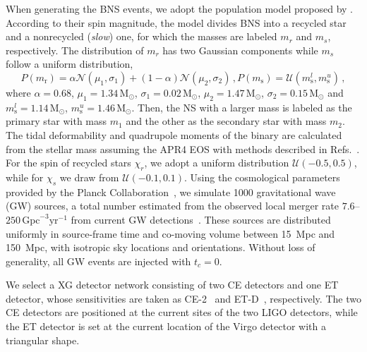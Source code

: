 \documentclass[a4paper,11pt]{article}
\begin{document}
When generating the BNS events, we adopt the population model proposed by \citet{Farrow:2019xnc}. 
According to their spin magnitude, the model divides BNS into a recycled star and a nonrecycled 
(\emph{slow}) one, for which the masses are labeled $m_r$ and $m_s$, respectively. 
The distribution of $m_r$ has two Gaussian components while $m_s$ follow a uniform distribution,
\begin{subequations}
\label{mass population}
\begin{equation}
    P(m_{\mathrm{r}}) = \alpha \mathcal{N}(\mu_1, \sigma_1) + (1-\alpha) \mathcal{N}(\mu_2, \sigma_2)\,,
\end{equation}
\begin{equation}
    P(m_{\mathrm{s}}) = \mathcal{U}(m_{\mathrm{s}}^l, m_{\mathrm{s}}^u)\,,
\end{equation}
\end{subequations}
where $\alpha=0.68$, $\mu_1=1.34\,\mathrm{M}_{\odot}$, $\sigma_1=0.02\,\mathrm{M}_
{\odot}$, $\mu_2=1.47\,\mathrm{M}_{\odot}$, $\sigma_2=0.15\,\mathrm{M}_{\odot}$ 
and $m_{\mathrm{s}}^l=1.14\,\mathrm{M}_{\odot}$, $m_{\mathrm{s}}^u=1.46\,\mathrm{M}_{\odot}$. Then, the NS with a larger mass is labeled as the primary star with mass $m_1$ and the other as the secondary star with mass $m_2$.
The tidal deformability and quadrupole moments of the binary are calculated from 
the stellar mass assuming the APR4 EOS with methods described in Refs.~\cite{Yagi:2013awa,Atta:2024ckt}. For the spin of recycled stars $\chi_r$, we adopt a uniform distribution $\mathcal{U}(-0.5,0.5)$, 
while for $\chi_s$ we draw from $\mathcal{U}(-0.1,0.1)$.
Using the cosmological parameters provided by the Planck Collaboration~\cite{Planck:2018vyg}, 
we simulate 1000 gravitational wave (GW) sources, a total number estimated from the observed local merger rate 
$7.6$--$250\,\mathrm{Gpc}^{-3}\mathrm{yr}^{-1}$ from current GW detections~\cite{LIGOScientific:2025pvj,LIGOScientific:2020aai}. 
These sources are distributed uniformly in source-frame time and co-moving volume between 15~Mpc and 150~Mpc, 
with isotropic sky locations and orientations. Without loss of generality, all GW events are injected with $t_c=0$.

We select a XG detector network consisting of two CE detectors and one ET 
detector, whose sensitivities are taken as CE-2~\cite{Reitze:2019iox,Reitze:2019dyk} 
and ET-D~\cite{Punturo:2010zz,Hild:2010id,Sathyaprakash:2012jk}, respectively. 
The two CE detectors are positioned at the current sites of the two LIGO detectors, 
while the ET detector is set at the current location of the Virgo detector with a triangular shape. 
\end{document}
